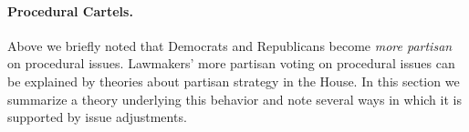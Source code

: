 


\paragraph{Procedural Cartels.}
\label{sec:procural_cartel_theory}
Above we briefly noted that Democrats and Republicans become
\emph{more partisan} on procedural issues.  Lawmakers' more partisan
voting on procedural issues can be explained by theories about
partisan strategy in the House.  In this section we summarize a theory
underlying this behavior and note several ways in which it is
supported by issue adjustments.

